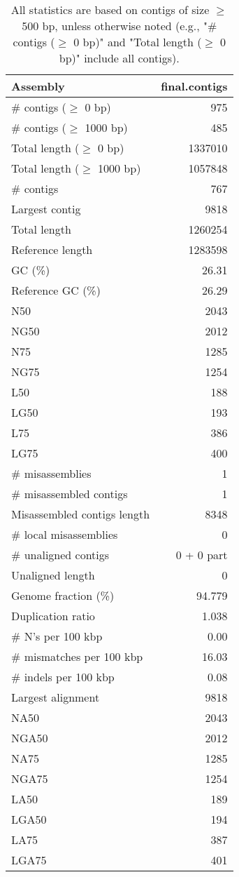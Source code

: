 \documentclass[12pt,a4paper]{article}
\begin{document}
\begin{table}[ht]
\begin{center}
\caption{All statistics are based on contigs of size $\geq$ 500 bp, unless otherwise noted (e.g., "\# contigs ($\geq$ 0 bp)" and "Total length ($\geq$ 0 bp)" include all contigs).}
\begin{tabular}{|l*{1}{|r}|}
\hline
Assembly & final.contigs \\ \hline
\# contigs ($\geq$ 0 bp) & 975 \\ \hline
\# contigs ($\geq$ 1000 bp) & 485 \\ \hline
Total length ($\geq$ 0 bp) & 1337010 \\ \hline
Total length ($\geq$ 1000 bp) & 1057848 \\ \hline
\# contigs & 767 \\ \hline
Largest contig & 9818 \\ \hline
Total length & 1260254 \\ \hline
Reference length & 1283598 \\ \hline
GC (\%) & 26.31 \\ \hline
Reference GC (\%) & 26.29 \\ \hline
N50 & 2043 \\ \hline
NG50 & 2012 \\ \hline
N75 & 1285 \\ \hline
NG75 & 1254 \\ \hline
L50 & 188 \\ \hline
LG50 & 193 \\ \hline
L75 & 386 \\ \hline
LG75 & 400 \\ \hline
\# misassemblies & 1 \\ \hline
\# misassembled contigs & 1 \\ \hline
Misassembled contigs length & 8348 \\ \hline
\# local misassemblies & 0 \\ \hline
\# unaligned contigs & 0 + 0 part \\ \hline
Unaligned length & 0 \\ \hline
Genome fraction (\%) & 94.779 \\ \hline
Duplication ratio & 1.038 \\ \hline
\# N's per 100 kbp & 0.00 \\ \hline
\# mismatches per 100 kbp & 16.03 \\ \hline
\# indels per 100 kbp & 0.08 \\ \hline
Largest alignment & 9818 \\ \hline
NA50 & 2043 \\ \hline
NGA50 & 2012 \\ \hline
NA75 & 1285 \\ \hline
NGA75 & 1254 \\ \hline
LA50 & 189 \\ \hline
LGA50 & 194 \\ \hline
LA75 & 387 \\ \hline
LGA75 & 401 \\ \hline
\end{tabular}
\end{center}
\end{table}
\end{document}
